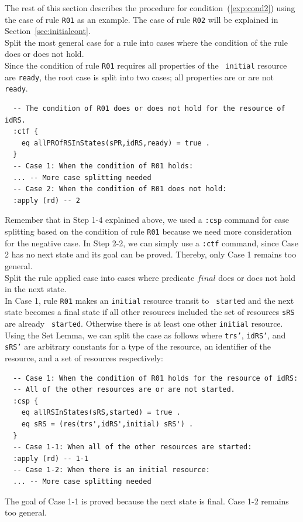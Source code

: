 \documentclass[12pt]{report}
\begin{document}
The rest of this section describes the procedure for condition~(\ref{exp:cond2})
using the case of rule {\tt R01} as an example. The case of rule {\tt R02} will
be explained in Section~\ref{sec:initialcont}.\\

 Split the most general case for a rule into
cases where the condition of the rule does or does not hold. \\ Since
the condition of rule {\tt R01} requires all properties of the {\tt
  initial} resource are {\tt ready}, the root case is split into two
cases; all properties are or are not {\tt ready}. 
\small
\begin{verbatim}
  -- The condition of R01 does or does not hold for the resource of idRS.
  :ctf {
    eq allPROfRSInStates(sPR,idRS,ready) = true .
  }
  -- Case 1: When the condition of R01 holds:
  ... -- More case splitting needed
  -- Case 2: When the condition of R01 does not hold:
  :apply (rd) -- 2
\end{verbatim}
\normalsize
Remember that in Step 1-4 explained above, we used a {\tt :csp}
command for case splitting based on the condition of rule {\tt R01}
because we need more consideration for the negative case.  In Step
2-2, we can simply use a {\tt :ctf} command, since Case 2 has no next
state and its goal can be proved. Thereby, only Case 1 remains too
general. \\

 Split the rule applied case into cases where
predicate $final$ does or does not hold in the next state.\\ In Case
1, rule {\tt R01} makes an {\tt initial} resource transit to {\tt
  started} and the next state becomes a final state if all other
resources included the set of resources {\tt sRS} are already {\tt
  started}. Otherwise there is at least one other {\tt initial}
resource.  Using the Set Lemma, we can split the case as follows where
{\tt trs'}, {\tt idRS'}, and {\tt sRS'} are arbitrary constants for a
type of the resource, an identifier of the resource, and a set of
resources respectively:
\small
\begin{verbatim}
  -- Case 1: When the condition of R01 holds for the resource of idRS:
  -- All of the other resources are or are not started.
  :csp {
    eq allRSInStates(sRS,started) = true .
    eq sRS = (res(trs',idRS',initial) sRS') .
  }
  -- Case 1-1: When all of the other resources are started:
  :apply (rd) -- 1-1
  -- Case 1-2: When there is an initial resource:
  ... -- More case splitting needed
\end{verbatim}
\normalsize
The goal of Case 1-1 is proved because the next state is final.  Case
1-2 remains too general.\\
\end{document}
